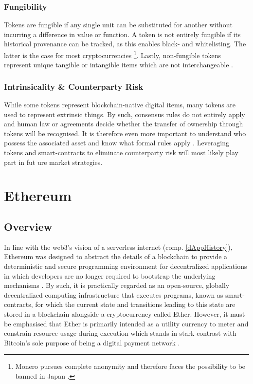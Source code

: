\subsubsection{Fungibility}
Tokens are fungible if any single unit can be substituted for another without incurring a difference in value or function. A token is not entirely fungible if its historical provenance can be tracked, as this enables black- and whitelisting. The latter is the case for most cryptocurrencies \footnote{Monero pursues complete anonymity and therefore faces the possibility to be banned in Japan \cite{monero}.}. Lastly, non-fungible tokens represent unique tangible or intangible items which are not interchangeable \cite[p.~175]{Antonopoulos.2018}.

\subsubsection{Intrinsicality \& Counterparty Risk}
While some tokens represent blockchain-native digital items, many tokens are used to represent extrinsic things. By such, consensus rules do not entirely apply and human law or agreements decide whether the transfer of ownership through tokens will be recognised. It is therefore even more important to understand who possess the associated asset and know what formal rules apply \cite[pp.~175-176]{Antonopoulos.2018}. Leveraging tokens and smart-contracts to eliminate counterparty risk will most likely play part in fut
ure market strategies.

\pagebreak

\section{Ethereum}
\subsection{Overview}
In line with the web3's vision of a serverless internet (comp. \ref{dAppHistory}), Ethereum was designed to abstract the details of a blockchain to provide a deterministic and secure programming environment for decentralized applications in which developers  are no longer required to bootstrap the underlying mechanisms \cite[p.~27]{Antonopoulos.2018}. By such, it is practically regarded as an open-source, globally decentralized computing infrastructure that executes programs, known as smart-contracts, for which the current state and transitions leading to this state are stored in a blockchain alongside a cryptocurrency called Ether. However, it must be emphasised that Ether is primarily intended as a utility currency to meter and constrain resource usage during execution which stands in stark contrast with Bitcoin's sole purpose of being a digital payment network \cite[p.~23]{Antonopoulos.2018} \cite[p.~1]{bitcoin}.

